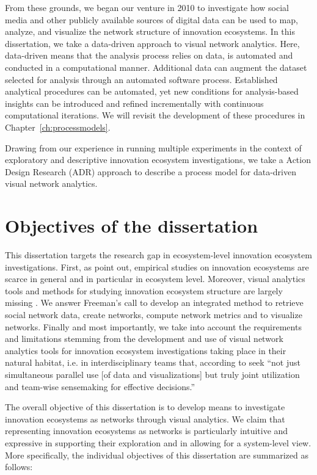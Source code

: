 From these grounds, we began our venture in 2010 to investigate how social media and other publicly available sources of digital data can be used to map, analyze, and visualize the network structure of innovation ecosystems. In this dissertation, we take a data-driven approach to visual network analytics. Here, data-driven means that the analysis process relies on data, is automated and conducted in a computational manner. Additional data can augment the dataset selected for analysis through an automated software process. Established analytical procedures can be automated, yet new conditions for analysis-based insights can be introduced and refined incrementally with continuous computational iterations. We will revisit the development of these procedures in Chapter~\ref{ch:processmodels}.

Drawing from our experience in running multiple experiments in the context of exploratory and descriptive innovation ecosystem investigations, we take a Action Design Research (ADR) \citep{Sein2011ActionResearch} approach to describe a process model for data-driven visual network analytics.

\section{Objectives of the dissertation}
\label{sec:objectives}

This dissertation targets the research gap in ecosystem-level innovation ecosystem investigations. First, as \cite{Jarvi2016TakingReview} point out, empirical studies on innovation ecosystems are scarce in general and in particular in ecosystem level. Moreover, visual analytics tools and methods for studying innovation ecosystem structure are largely missing \citep[cf.][]{Basole2009VisualizationEcosystem}. We answer Freeman's \citeyear{Freeman2000VisualizingNetworks} call to develop an integrated method to retrieve social network data, create networks, compute network metrics and to visualize networks. Finally and most importantly, we take into account the requirements and limitations stemming from the development and use of visual network analytics tools for innovation ecosystem investigations taking place in their natural habitat, i.e. in interdisciplinary teams that, according to \cite{Bendoly2016FitAnalytics} seek ``not just simultaneous parallel use [of data and visualizations] but truly joint utilization and team-wise sensemaking for effective decisions.''

The overall objective of this dissertation is to develop means to investigate innovation ecosystems as networks through visual analytics. We claim that representing innovation ecosystems as networks is particularly intuitive and expressive in supporting their exploration and in allowing for a system-level view. More specifically, the individual objectives of this dissertation are summarized as follows:

